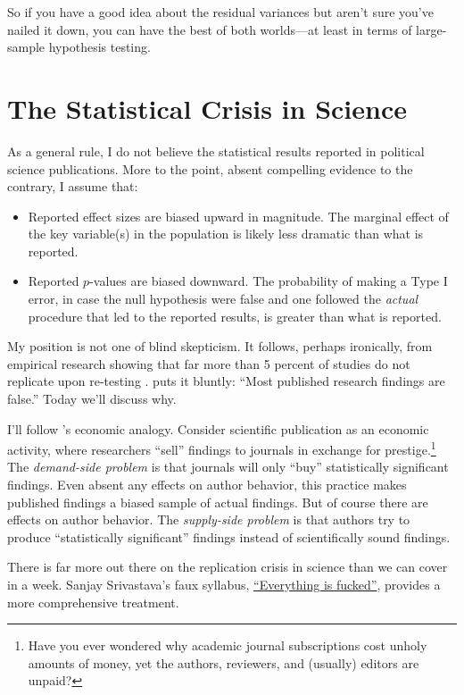 \documentclass[
  12pt,
  oneside,openany]{book}
\begin{document}
So if you have a good idea about the residual variances but aren't sure you've nailed it down, you can have the best of both worlds---at least in terms of large-sample hypothesis testing.

\hypertarget{crisis}{%
\chapter{The Statistical Crisis in Science}\label{crisis}}

As a general rule, I do not believe the statistical results reported in political science publications. More to the point, absent compelling evidence to the contrary, I assume that:

\begin{itemize}
\item
  Reported effect sizes are biased upward in magnitude. The marginal effect of the key variable(s) in the population is likely less dramatic than what is reported.
\item
  Reported \(p\)-values are biased downward. The probability of making a Type I error, in case the null hypothesis were false and one followed the \emph{actual} procedure that led to the reported results, is greater than what is reported.
\end{itemize}

My position is not one of blind skepticism. It follows, perhaps ironically, from empirical research showing that far more than 5 percent of studies do not replicate upon re-testing \citep{open2015estimating}. \citet{ioannidis2005most} puts it bluntly: ``Most published research findings are false.'' Today we'll discuss why.

I'll follow \citet{young2008current}'s economic analogy. Consider scientific publication as an economic activity, where researchers ``sell'' findings to journals in exchange for prestige.\footnote{Have you ever wondered why academic journal subscriptions cost unholy amounts of money, yet the authors, reviewers, and (usually) editors are unpaid?} The \emph{demand-side problem} is that journals will only ``buy'' statistically significant findings. Even absent any effects on author behavior, this practice makes published findings a biased sample of actual findings. But of course there are effects on author behavior. The \emph{supply-side problem} is that authors try to produce ``statistically significant'' findings instead of scientifically sound findings.

There is far more out there on the replication crisis in science than we can cover in a week. Sanjay Srivastava's faux syllabus, \href{https://hardsci.wordpress.com/2016/08/11/everything-is-fucked-the-syllabus/}{``Everything is fucked''}, provides a more comprehensive treatment.
\end{document}
